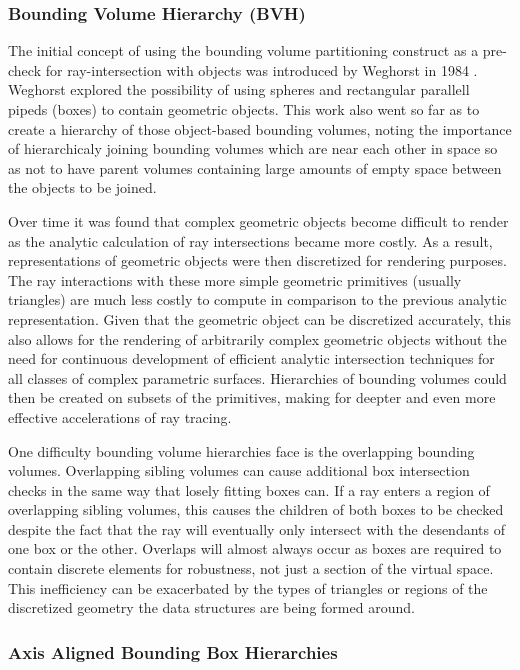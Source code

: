 \documentclass[12pt, a4paper]{article}
\begin{document}
\subsubsection{Bounding Volume Hierarchy (BVH)}%

The initial concept of using the bounding volume partitioning construct as a pre-check for ray-intersection with objects was introduced by Weghorst in 1984 \cite{Weghorst:1984:ICM}. Weghorst explored the possibility of using spheres and rectangular parallell pipeds (boxes) to contain geometric objects. This work also went so far as to create a hierarchy of those object-based bounding volumes, noting the importance of hierarchicaly joining bounding volumes which are near each other in space so as not to have parent volumes containing large amounts of empty space between the objects to be joined.

Over time it was found that complex geometric objects become difficult to render as the analytic calculation of ray intersections became more costly. As a result, representations of geometric objects were then discretized for rendering purposes. The ray interactions with these more simple geometric primitives (usually triangles) are much less costly to compute in comparison to the previous analytic representation. Given that the geometric object can be discretized accurately, this also allows for the rendering of arbitrarily complex geometric objects without the need for continuous development of efficient analytic intersection techniques for all classes of complex parametric surfaces. Hierarchies of bounding volumes could then be created on subsets of the primitives, making for deepter and even more effective accelerations of ray tracing.

One difficulty bounding volume hierarchies face is the overlapping bounding volumes. Overlapping sibling volumes can cause additional box intersection checks in the same way that losely fitting boxes can. If a ray enters a region of overlapping sibling volumes, this causes the children of both boxes to be checked despite the fact that the ray will eventually only intersect with the desendants of one box or the other. Overlaps will almost always occur as boxes are required to contain discrete elements for robustness, not just a section of the virtual space. This inefficiency can be exacerbated by the types of triangles or regions of the discretized geometry the data structures are being formed around.


\subsubsection{Axis Aligned Bounding Box Hierarchies}%
\end{document}
